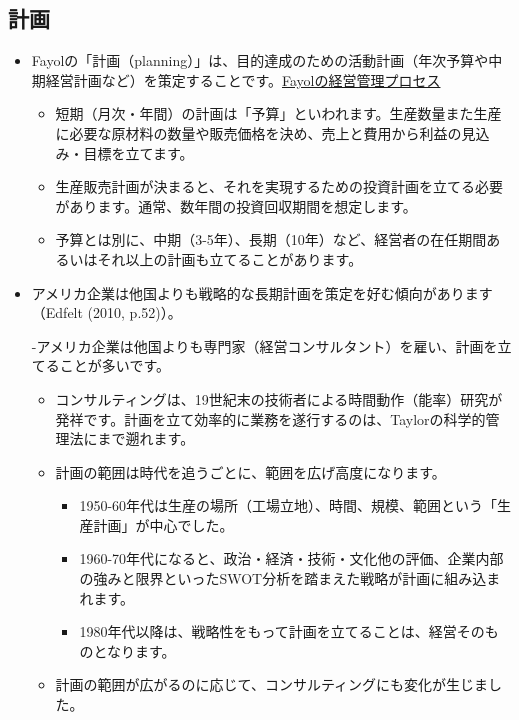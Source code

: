 \documentclass[
]{book}
\begin{document}
\hypertarget{us-plan}{%
\subsection{計画}\label{us-plan}}

\begin{itemize}
\item
  Fayolの「計画（planning）」は、目的達成のための活動計画（年次予算や中期経営計画など）を策定することです。\protect\hyperlink{fayol}{Fayolの経営管理プロセス}

  \begin{itemize}
  \item
    短期（月次・年間）の計画は「予算」といわれます。生産数量また生産に必要な原材料の数量や販売価格を決め、売上と費用から利益の見込み・目標を立てます。
  \item
    生産販売計画が決まると、それを実現するための投資計画を立てる必要があります。通常、数年間の投資回収期間を想定します。
  \item
    予算とは別に、中期（3-5年）、長期（10年）など、経営者の在任期間あるいはそれ以上の計画も立てることがあります。
  \end{itemize}
\item
  アメリカ企業は他国よりも戦略的な長期計画を策定を好む傾向があります（Edfelt (2010, p.52)）。

  -アメリカ企業は他国よりも専門家（経営コンサルタント）を雇い、計画を立てることが多いです。

  \begin{itemize}
  \item
    コンサルティングは、19世紀末の技術者による時間動作（能率）研究が発祥です。計画を立て効率的に業務を遂行するのは、Taylorの科学的管理法にまで遡れます。
  \item
    計画の範囲は時代を追うごとに、範囲を広げ高度になります。

    \begin{itemize}
    \item
      1950-60年代は生産の場所（工場立地）、時間、規模、範囲という「生産計画」が中心でした。
    \item
      1960-70年代になると、政治・経済・技術・文化他の評価、企業内部の強みと限界といったSWOT分析を踏まえた戦略が計画に組み込まれます。
    \item
      1980年代以降は、戦略性をもって計画を立てることは、経営そのものとなります。
    \end{itemize}
  \item
    計画の範囲が広がるのに応じて、コンサルティングにも変化が生じました。


\end{itemize}
\end{itemize}
\end{document}

